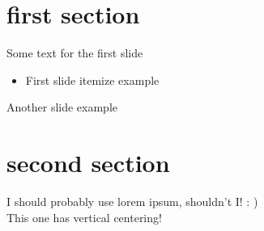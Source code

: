 \documentclass{shard}
\begin{document}
    \titleframe
    \section{first section}
    \begin{frame}
        Some text for the first slide
        \begin{itemize}
            \item[\bdot] First slide itemize example
        \end{itemize}
    \end{frame}
    \begin{frame}
        Another slide example
    \end{frame}
    \section{second section}
    \begin{frame}[thing][0][{}][0][{}][1]
        I should probably use lorem ipsum, shouldn't I! : )\\
        This one has vertical centering!
    \end{frame}
\end{document}
